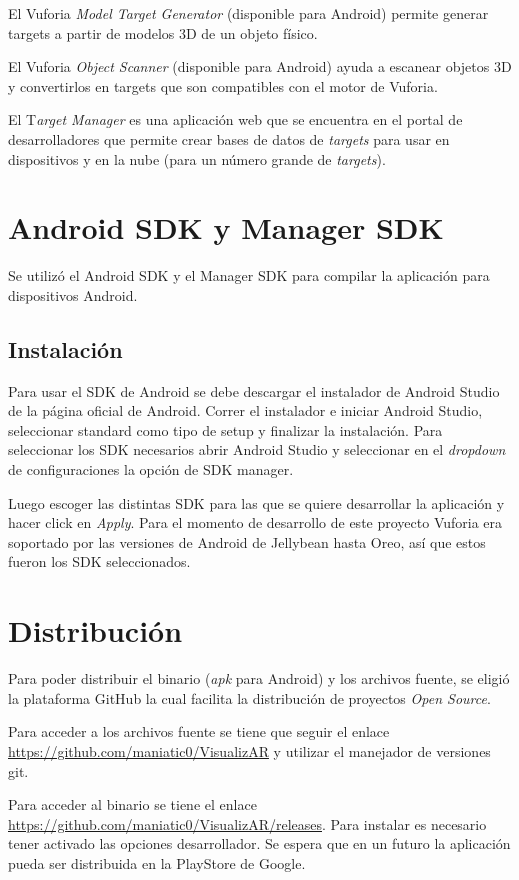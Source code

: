 El Vuforia \textit{Model Target Generator} (disponible para Android) permite generar targets a partir de modelos 3D de un objeto físico.

El Vuforia \textit{Object Scanner} (disponible para Android) ayuda a escanear objetos 3D y convertirlos en targets que son compatibles con el motor de Vuforia.

El T\textit{arget Manager} es una aplicación web que se encuentra en el portal de desarrolladores que permite crear bases de datos de \textit{targets} para usar en dispositivos y en la nube (para un número grande de \textit{targets}).

\section{Android SDK y Manager SDK}
Se utilizó el Android SDK y el Manager SDK para compilar la aplicación para dispositivos Android.

\subsection{Instalación}
Para usar el SDK de Android se debe descargar el instalador de Android Studio de la página oficial de Android. Correr el instalador e iniciar Android Studio, seleccionar standard como tipo de setup y finalizar la instalación. Para seleccionar los SDK necesarios abrir Android Studio y seleccionar en el \textit{dropdown} de configuraciones la opción de SDK manager.

Luego escoger las distintas SDK para las que se quiere desarrollar la aplicación y hacer click en \textit{Apply}. Para el momento de desarrollo de este proyecto Vuforia era soportado por las versiones de Android de Jellybean hasta Oreo, así que estos fueron los SDK seleccionados.

\section{Distribución}
Para poder distribuir el binario (\textit{apk} para Android) y los archivos fuente, se eligió la plataforma GitHub la cual facilita la distribución de proyectos \textit{Open Source}. 

Para acceder a los archivos fuente se tiene que seguir el enlace \url{https://github.com/maniatic0/VisualizAR} y utilizar el manejador de versiones git.

Para acceder al binario se tiene el enlace \url{https://github.com/maniatic0/VisualizAR/releases}. Para instalar es necesario tener activado las opciones desarrollador. Se espera que en un futuro la aplicación pueda ser distribuida en la PlayStore de Google.


